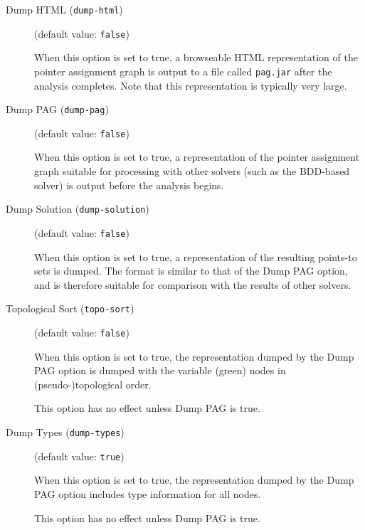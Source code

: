 \documentclass{article}
\begin{document}
\begin{description}

\item[Dump HTML ({\tt dump-html})]
(default value: {\tt false})




When this option is set to true, a browseable HTML representation of the
pointer assignment graph is output to a file called {\tt pag.jar} after the analysis completes. Note
that this representation is typically very large.
        


\item[Dump PAG ({\tt dump-pag})]
(default value: {\tt false})




When this option is set to true, a representation of the pointer assignment graph
suitable for processing with other solvers (such as the BDD-based solver) is
output before the analysis begins.
        


\item[Dump Solution ({\tt dump-solution})]
(default value: {\tt false})




When this option is set to true, a representation of the resulting points-to
sets is dumped. The format is similar to that of the Dump PAG
option, and is therefore suitable for comparison with the results of other
solvers.
        


\item[Topological Sort ({\tt topo-sort})]
(default value: {\tt false})




When this option is set to true, the representation dumped by the
Dump PAG option
is dumped with the variable (green) nodes in (pseudo-)topological order.

This option has no effect unless Dump PAG is true.
        


\item[Dump Types ({\tt dump-types})]
(default value: {\tt true})




When this option is set to true, the representation dumped by the
Dump PAG option
includes type information for all nodes.

This option has no effect unless Dump PAG is true.
        



\end{description}
\end{document}
